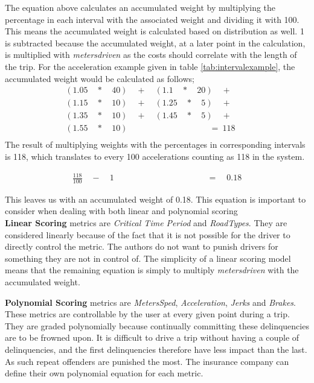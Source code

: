 The equation above calculates an accumulated weight by multiplying the percentage in each interval with the associated weight and dividing it with 100. This means the accumulated weight is calculated based on distribution as well. 1 is subtracted because the accumulated weight, at a later point in the calculation, is multiplied with \textit{metersdriven} as the costs should correlate with the length of the trip. For the acceleration example given in table \ref{tab:intervalexample}, the accumulated weight would be calculated as follows;
\begin{align*}
(1.05\quad *\quad 40)\quad +\quad (1.1\quad *\quad 20)\quad +\quad \quad \\ 
  (1.15\quad *\quad 10)\quad +\quad (1.25\quad *\quad 5)\quad +\quad \quad \\
  (1.35\quad *\quad 10)\quad +\quad (1.45\quad *\quad 5)\quad +\quad \quad \\
  (1.55\quad *\quad 10)\quad \quad \quad \quad \quad \quad \quad \quad \ \ \ \quad =\ 118 \\
\end{align*}
The result of multiplying weights with the percentages in corresponding intervals is 118, which translates to every 100 accelerations counting as 118 in the system.

\begin{align*}
\frac { 118 }{ 100 } \quad -\quad 1\quad \quad \quad \quad \quad \quad \quad \quad \quad \quad \quad  =\quad 0.18
\end{align*}


This leaves us with an accumulated weight of 0.18. This equation is important to consider when dealing with both linear and polynomial scoring\\

\textbf{Linear Scoring} metrics are \textit{Critical Time Period} and \textit{RoadTypes}. They are considered linearly because of the fact that it is not possible for the driver to directly control the metric. The authors do not want to punish drivers for something they are not in control of. 
The simplicity of a linear scoring model means that the remaining equation is simply to multiply \textit{metersdriven} with the accumulated weight.

\textbf{Polynomial Scoring} metrics are \textit{MetersSped}, \textit{Acceleration}, \textit{Jerks} and \textit{Brakes}. These metrics are controllable by the user at every given point during a trip. They are graded polynomially because continually committing these delinquencies are to be frowned upon. It is difficult to drive a trip without having a couple of delinquencies, and the first delinquencies therefore have less impact than the last. As such repeat offenders are punished the most. The insurance company can define their own polynomial equation for each metric.


